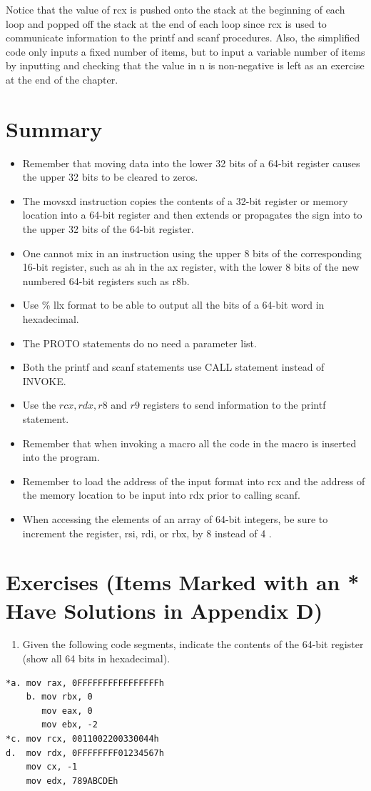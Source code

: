 \documentclass[10pt]{book}
\begin{document}
Notice that the value of rcx is pushed onto the stack at the beginning of each loop and popped off the stack at the end of each loop since rcx is used to communicate information to the printf and scanf procedures. Also, the simplified code only inputs a fixed number of items, but to input a variable number of items by inputting and checking that the value in n is non-negative is left as an exercise at the end of the chapter.
\section{Summary}
\begin{itemize}
  \item Remember that moving data into the lower 32 bits of a 64-bit register causes the upper 32 bits to be cleared to zeros.
  \item The movsxd instruction copies the contents of a 32-bit register or memory location into a 64-bit register and then extends or propagates the sign into to the upper 32 bits of the 64-bit register.
  \item One cannot mix in an instruction using the upper 8 bits of the corresponding 16-bit register, such as ah in the ax register, with the lower 8 bits of the new numbered 64-bit registers such as r8b.
  \item Use \% llx format to be able to output all the bits of a 64-bit word in hexadecimal.
  \item The PROTO statements do no need a parameter list.
  \item Both the printf and scanf statements use CALL statement instead of INVOKE.
  \item Use the $r c x, r d x, r 8$ and $r 9$ registers to send information to the printf statement.
  \item Remember that when invoking a macro all the code in the macro is inserted into the program.
  \item Remember to load the address of the input format into rcx and the address of the memory location to be input into rdx prior to calling scanf.
  \item When accessing the elements of an array of 64-bit integers, be sure to increment the register, rsi, rdi, or rbx, by 8 instead of 4 .
\end{itemize}

\section{Exercises (Items Marked with an * Have Solutions in Appendix D)}
\begin{enumerate}
  \item Given the following code segments, indicate the contents of the 64-bit register (show all 64 bits in hexadecimal).
\end{enumerate}
\begin{verbatim}
*a. mov rax, 0FFFFFFFFFFFFFFFFh
    b. mov rbx, 0
       mov eax, 0
       mov ebx, -2
*c. mov rcx, 0011002200330044h
d.  mov rdx, 0FFFFFFFF01234567h
    mov cx, -1
    mov edx, 789ABCDEh
\end{verbatim}
\end{document}
